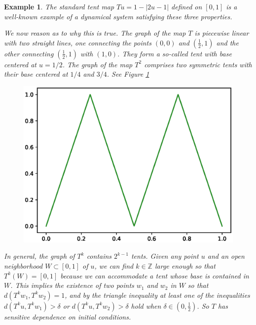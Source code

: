 \documentclass[a4paper,12pt,twoside]{report}
\newtheorem{Example}{Example}[]
\begin{document}
\begin{Example} \rm
  The standard tent map $Tu=1-|2u-1|$ defined on $[0,1]$ is a well-known example of a dynamical system satisfying these three properties. 

  We now reason as to why this is true. The graph of the map $T$ is piecewise linear with two straight lines, one connecting the points $(0,0)$ and $(\frac{1}{2},1)$ and the other connecting $(\frac{1}{2},1)$ with $(1,0)$. They form a so-called tent with base centered at $u=1/2$. The graph of the map $T^2$ comprises two symmetric tents with their base centered at $1/4$ and $3/4$. See Figure \ref{fig:T2tentmap}

  \begin{figure}[ht]
    \includegraphics[scale=0.6]{_tentmap_2.eps}
        \centering
        \label{fig:T2tentmap}
  \end{figure}
  
  In general, the graph of  $T^k$ contains $2^{k-1}$ tents.
  Given any point $u$ and an open neighborhood $W \subset[0,1]$ of $u$, we can find $k\in\mathbb{Z}$ large enough so that $T^k(W) = [0,1]$ because we can accommodate a tent whose base is contained in $W$. %
  This implies the existence of two points $w_1$ and $w_2$ in $W$ so that $d(T^kw_1,T^kw_2)= 1$, and by the triangle inequality  at least one of the inequalities $d(T^ku,T^kw_1)> \delta$ or $d(T^ku,T^kw_2)> \delta$ hold when $\delta\in (0,\frac{1}{2})$.  So $T$ has sensitive dependence on initial conditions.
  

\end{Example}
\end{document}
